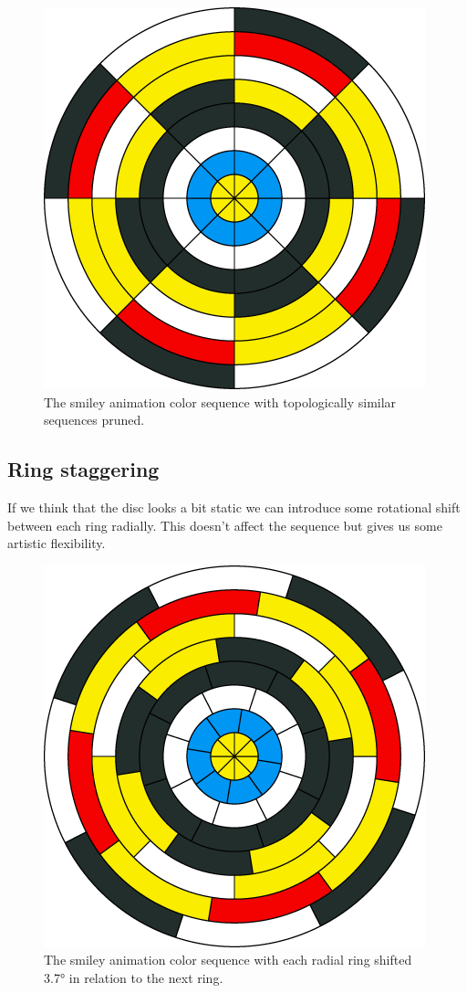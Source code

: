 \documentclass{article}
\begin{document}
\begin{figure}[ht!]
\centering
\includegraphics{images/sequence-wheel-removed-redundancies.png}
\caption{The smiley animation color sequence with topologically similar sequences pruned.}
\end{figure}



\subsection{Ring staggering}

If we think that the disc looks a bit static we can introduce some
rotational shift between each ring radially. This doesn't affect the
sequence but gives us some artistic flexibility.

\begin{figure}[ht!]
\centering
\includegraphics{images/sequence-wheel-helix-shift.png}
\caption{The smiley animation color sequence with each radial ring shifted 3.7° in relation to the next ring.}
\end{figure}
\end{document}
